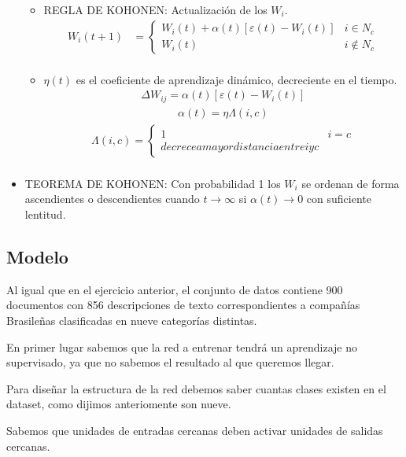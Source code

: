 \begin{itemize}
\begin{itemize}
			\item REGLA DE KOHONEN: Actualización de los $W_{i}$.
					\begin{align*}
					 W_{i}(t+1) &=  \begin{cases}
										W_{i}(t) + \alpha(t) [ \varepsilon(t) - W_{i}(t) ] & i \in N_{c} \\
										W_{i}(t)                                           & i \not \in N_{c}  
									\end{cases} \\
					\end{align*}
			\item $\eta(t)$ es el coeficiente de aprendizaje dinámico, decreciente en el tiempo.
				\begin{align*}
					\Delta W_{ij} = \alpha(t) [ \varepsilon(t) - W_{i}(t) ]
				\end{align*}
				\begin{align*}
					\alpha(t) = \eta \Lambda(i,c)
				\end{align*}
				\begin{align*}
					\Lambda(i,c) = \begin{cases}
										1 & i = c \\
										decrece a mayor distancia entre i y c 
									\end{cases} \\
				\end{align*}
		\end{itemize}
	\item TEOREMA DE KOHONEN: Con probabilidad 1 los $W_{i}$ se ordenan de forma ascendientes o descendientes cuando $t \to
		\infty$ si $\alpha(t) \to 0$ con suficiente lentitud.
\end{itemize}

\subsection{Modelo}
Al igual que en el ejercicio anterior, el conjunto de datos contiene 900 documentos con 856 descripciones de texto 
correspondientes a compañías Brasileñas clasificadas en nueve categorías distintas.

En primer lugar sabemos que la red a entrenar tendrá un aprendizaje no supervisado, ya que no sabemos el resultado al que
queremos llegar.

Para diseñar la estructura de la red debemos saber cuantas clases existen en el dataset, como dijimos anteriomente son nueve.

Sabemos que unidades de entradas cercanas deben activar unidades de salidas cercanas.

